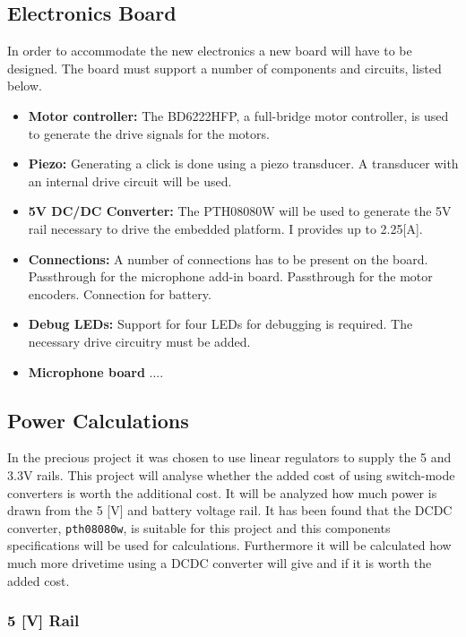 \subsection{Electronics Board} %
\label{sub:electronics_board}
In order to accommodate the new electronics a new board will have to be designed.
The board must support a number of components and circuits, listed below.
\begin{itemize}
	\item \textbf{Motor controller:} The BD6222HFP, a full-bridge motor controller, is used to generate the drive signals for the motors.
	\item \textbf{Piezo:} Generating a click is done using a piezo transducer.
	A transducer with an internal drive circuit will be used.
	\item \textbf{5V DC/DC Converter:} The PTH08080W will be used to generate the 5V rail necessary to drive the embedded platform. I provides up to 2.25[A].
	\item \textbf{Connections:} A number of connections has to be present on the board.
	Passthrough for the microphone add-in board.
	Passthrough for the motor encoders.
	Connection for battery.
	\item \textbf{Debug LEDs:} Support for four LEDs for debugging is required.
	The necessary drive circuitry must be added.
	\item \textbf{Microphone board} ....
\end{itemize}


\subsection{Power Calculations} %
\label{sub:power_calculations}
In the precious project it was chosen to use linear regulators to supply the 5 and 3.3V rails.
This project will analyse whether the added cost of using switch-mode converters is worth the additional cost.
It will be analyzed how much power is drawn from the 5 [V] and battery voltage rail.
It has been found that the DCDC converter, \texttt{pth08080w}, is suitable for this project and this components specifications will be used for calculations. 
Furthermore it will be calculated how much more drivetime using a DCDC converter will give and if it is worth the added cost. 

\subsubsection*{5 [V] Rail} %

